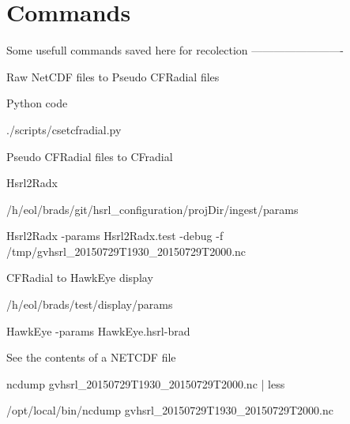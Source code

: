 
\chapter{Commands}
\label{SECTION-Commands}

Some usefull commands saved here for recolection
\newline
-------------------------
\newline


Raw NetCDF files to Pseudo CFRadial files

Python code 

./scripts/cset\-cfradial.py 
\newline
\newline



Pseudo CFRadial files to CFradial

Hsrl2Radx

/h/eol/brads/git/hsrl\_configuration/projDir/ingest/params

Hsrl2Radx -params Hsrl2Radx.test -debug -f /tmp/gvhsrl\_20150729T1930\_20150729T2000.nc
\newline
\newline


CFRadial to HawkEye display

/h/eol/brads/test/display/params

HawkEye -params HawkEye.hsrl-brad
\newline
\newline

See the contents of a NETCDF file

ncdump gvhsrl\_20150729T1930\_20150729T2000.nc | less


/opt/local/bin/ncdump gvhsrl\_20150729T1930\_20150729T2000.nc
